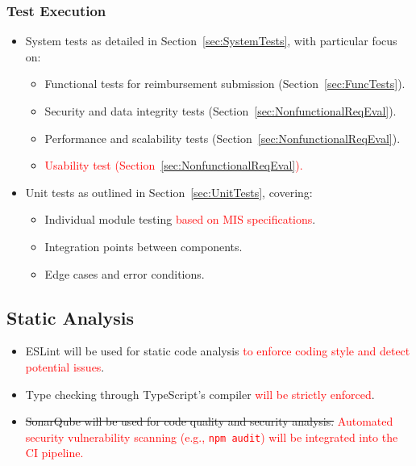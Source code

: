 \documentclass[12pt, titlepage]{article}
\begin{document}
\subsubsection*{Test Execution}
\begin{itemize}
  \item System tests as detailed in Section~\ref{sec:SystemTests}, with particular focus on: 
  \begin{itemize}
    \item Functional tests for reimbursement submission (Section~\ref{sec:FuncTests}). 
    \item Security and data integrity tests (Section~\ref{sec:NonfunctionalReqEval}). 
    \item Performance and scalability tests (Section~\ref{sec:NonfunctionalReqEval}). 
    \item \textcolor{red}{Usability test (Section~\ref{sec:NonfunctionalReqEval}).} 
  \end{itemize}
  \item Unit tests as outlined in Section~\ref{sec:UnitTests}, covering: 
  \begin{itemize}
    \item Individual module testing \textcolor{red}{based on MIS specifications}.
    \item Integration points between components.
    \item Edge cases and error conditions.
  \end{itemize}
\end{itemize}

\subsection*{Static Analysis}
\begin{itemize}
  \item ESLint will be used for static code analysis \textcolor{red}{to enforce coding style and detect potential issues}.
  \item Type checking through TypeScript's compiler \textcolor{red}{will be strictly enforced}.
  \item \sout{SonarQube will be used for code quality and security analysis.} \textcolor{red}{Automated security vulnerability scanning (e.g., \texttt{npm audit}) will be integrated into the CI pipeline.}
\end{itemize}
\end{document}
